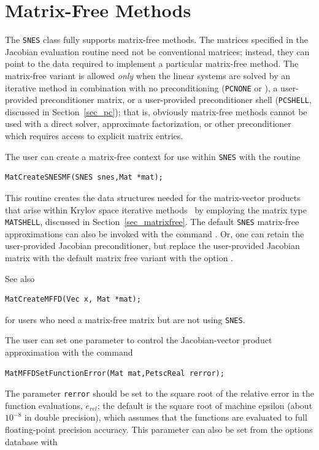 \section{Matrix-Free Methods}
\label{sec_nlmatrixfree}

The \lstinline{SNES} class fully supports matrix-free methods. The matrices specified in the
Jacobian evaluation routine need not be conventional
matrices; instead, they can point to the data required to implement a
particular matrix-free method.  The matrix-free variant is allowed
{\em only} when the linear systems are solved by an iterative method
in combination with no preconditioning (\lstinline{PCNONE} or  ),
a user-provided preconditioner matrix, or a user-provided preconditioner
shell (\lstinline{PCSHELL}, discussed in Section~\ref{sec_pc}); that is,
obviously matrix-free methods cannot be used with a direct solver, approximate factorization, or other preconditioner
which requires access to explicit matrix entries.

The user can create a matrix-free context for use within \lstinline{SNES} with
the routine
\begin{lstlisting}
MatCreateSNESMF(SNES snes,Mat *mat);
\end{lstlisting}
This routine creates the data structures needed for the matrix-vector
products that arise within Krylov space iterative methods~\cite{brownsaad:90}
by employing the matrix type \lstinline{MATSHELL},
discussed in Section~\ref{sec_matrixfree}.  The default \lstinline{SNES} matrix-free
approximations can also be invoked with the command . 
Or, one can retain the user-provided Jacobian preconditioner, but replace the
user-provided Jacobian matrix with the default matrix free variant with the
option . 

See also
\begin{lstlisting}
MatCreateMFFD(Vec x, Mat *mat);
\end{lstlisting}
for users who need a matrix-free matrix but are not using \lstinline{SNES}.

The user can set one parameter to control the Jacobian-vector
product approximation with the command
\begin{lstlisting}
MatMFFDSetFunctionError(Mat mat,PetscReal rerror);
\end{lstlisting}
The parameter \lstinline{rerror} should be set to the square root of the
relative error in the function evaluations, $e_{rel}$; the default is the square root of machine epsilon (about $10^{-8}$ in double precision),
which assumes that the functions are evaluated to full floating-point precision accuracy.
This parameter can also be set from the options database with

